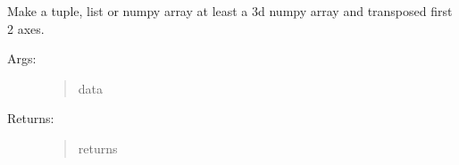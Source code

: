 \documentclass[letterpaper,10pt,english]{sphinxmanual}
\begin{document}
\begin{fulllineitems}
\label{\detokenize{utils:luxpy.utils.helpers.np3dT}}
Make a tuple, list or numpy array at least a 3d numpy array and transposed 
first 2 axes.
\begin{description}
\item[{Args:}] \leavevmode\begin{quote}\begin{description}
\item[{data}] \leavevmode
{}

\end{description}\end{quote}

\item[{Returns:}] \leavevmode\begin{quote}\begin{description}
\item[{returns}] \leavevmode
{}

\end{description}\end{quote}

\end{description}

\end{fulllineitems}

\end{document}
